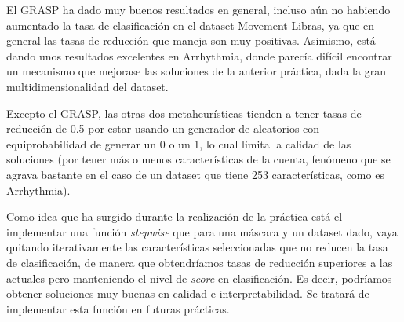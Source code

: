 \documentclass[a4paper,11pt]{article}
\begin{document}
  El GRASP ha dado muy buenos resultados en general, incluso aún no habiendo aumentado la tasa de clasificación en el 
  dataset Movement Libras, ya que en general las tasas de reducción que maneja son muy positivas. Asimismo, está dando
  unos resultados excelentes en Arrhythmia, donde parecía difícil encontrar un mecanismo que mejorase las soluciones de
  la anterior práctica, dada la gran multidimensionalidad del dataset.
  
  Excepto el GRASP, las otras dos metaheurísticas tienden a tener tasas de reducción de 0.5 por estar usando un generador
  de aleatorios con equiprobabilidad de generar un 0 o un 1, lo cual limita la calidad de las soluciones (por tener más 
  o menos características de la cuenta, fenómeno que se agrava bastante en el caso de un dataset que tiene 253 
  características, como es Arrhythmia).
  
  Como idea que ha surgido durante la realización de la práctica está el implementar una función \textit{stepwise} que para
  una máscara y un dataset dado, vaya quitando iterativamente las características seleccionadas que no reducen la tasa de
  clasificación, de manera que obtendríamos tasas de reducción superiores a las actuales pero manteniendo el nivel de 
  \textit{score} en clasificación. Es decir, podríamos obtener soluciones muy buenas en calidad e interpretabilidad. Se
  tratará de implementar esta función en futuras prácticas.
  
\end{document}
